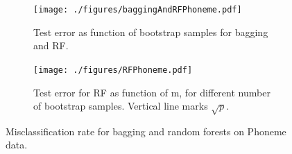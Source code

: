 \begin{figure}[h!]
  \centering
  \begin{subfigure}[b]{0.48\textwidth}
    \texttt{[image: ./figures/baggingAndRFPhoneme.pdf]}
    \caption{Test error as function of bootstrap samples for bagging and RF.}
    \label{fig:baggingAndRFPhoneme}
  \end{subfigure}%
  \quad
  \begin{subfigure}[b]{0.48\textwidth}
    \texttt{[image: ./figures/RFPhoneme.pdf]}
    \caption{Test error for RF as function of m, for different number of bootstrap samples. Vertical line marks $\sqrt{p}$.}
    \label{fig:RFPhoneme}
  \end{subfigure}
  \vspace{1\baselineskip}
  \caption{Misclassification rate for bagging and random forests on Phoneme data.}
  \label{fig:baggAndRFPhoneme}
\end{figure}


\clearpage
